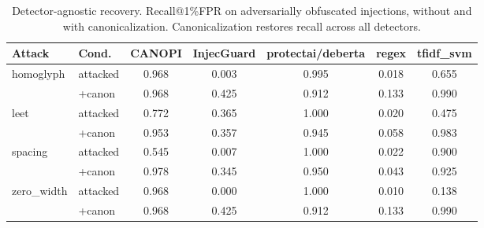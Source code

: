 \begin{table}[ht]\centering
\caption{Detector-agnostic recovery. Recall@1\%FPR on adversarially obfuscated injections, without and with canonicalization. Canonicalization restores recall across all detectors.}
\label{tab:recovery}
\small
\begin{tabular}{llccccc}
\toprule
Attack & Cond. & CANOPI & InjecGuard & protectai/deberta & regex & tfidf_svm \\
\midrule
homoglyph & attacked & 0.968 & 0.003 & 0.995 & 0.018 & 0.655 \\
 & +canon & 0.968 & 0.425 & 0.912 & 0.133 & 0.990 \\
\midrule
leet & attacked & 0.772 & 0.365 & 1.000 & 0.020 & 0.475 \\
 & +canon & 0.953 & 0.357 & 0.945 & 0.058 & 0.983 \\
\midrule
spacing & attacked & 0.545 & 0.007 & 1.000 & 0.022 & 0.900 \\
 & +canon & 0.978 & 0.345 & 0.950 & 0.043 & 0.925 \\
\midrule
zero_width & attacked & 0.968 & 0.000 & 1.000 & 0.010 & 0.138 \\
 & +canon & 0.968 & 0.425 & 0.912 & 0.133 & 0.990 \\
\midrule
\bottomrule
\end{tabular}
\end{table}
